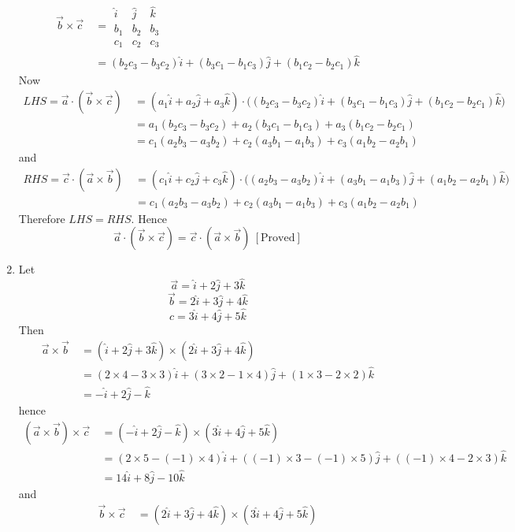 \documentclass{article}
\begin{document}
\begin{enumerate}
\begin{align*}
		\vec{b}\times\vec{c}\ &=\begin{array}{|ccc|}
			\hat{i}&\hat{j}&\hat{k}\\
			b_1&b_2&b_3\\
			c_1&c_2&c_3
		\end{array}\\
		&=(b_2c_3-b_3c_2)\hat{i}+(b_3c_1-b_1c_3)\hat{j}+(b_1c_2-b_2c_1)\hat{k}
		\end{align*}Now\begin{align*}
			LHS=\vec{a}\cdot (\vec{b}\times\vec{c})\ &=(a_1\hat{i}+a_2\hat{j}+a_3\hat{k})\cdot\Big((b_2c_3-b_3c_2)\hat{i}+(b_3c_1-b_1c_3)\hat{j}+(b_1c_2-b_2c_1)\hat{k}\Big)\\
			&=a_1(b_2c_3-b_3c_2)+a_2(b_3c_1-b_1c_3)+a_3(b_1c_2-b_2c_1)\\
			&=c_1(a_2b_3-a_3b_2)+c_2(a_3b_1-a_1b_3)+c_3(a_1b_2-a_2b_1)
		\end{align*}
		and\begin{align*}
			RHS=\vec{c}\cdot (\vec{a}\times\vec{b})\ &=(c_1\hat{i}+c_2\hat{j}+c_3\hat{k})\cdot\Big((a_2b_3-a_3b_2)\hat{i}+(a_3b_1-a_1b_3)\hat{j}+(a_1b_2-a_2b_1)\hat{k}\Big)\\
			&=c_1(a_2b_3-a_3b_2)+c_2(a_3b_1-a_1b_3)+c_3(a_1b_2-a_2b_1)
		\end{align*}
		Therefore $LHS=RHS$. Hence$$\vec{a}\cdot(\vec{b}\times\vec{c})=\vec{c}\cdot(\vec{a}\times\vec{b})\ [\text{Proved}]$$
		\item Let$$\vec{a}=\hat{i}+2\hat{j}+3\hat{k}$$$$\vec{b}=2\hat{i}+3\hat{j}+4\hat{k}$$$$c=3\hat{i}+4\hat{j}+5\hat{k}$$
		Then\begin{align*}
			\vec{a}\times\vec{b}\ &=(\hat{i}+2\hat{j}+3\hat{k})\times(2\hat{i}+3\hat{j}+4\hat{k})\\
			&=(2\times4-3\times3)\hat{i}+(3\times 2-1\times 4)\hat{j}+(1\times3-2\times2)\hat{k}\\
			&=-\hat{i}+2\hat{j}-\hat{k}
		\end{align*}hence
	\begin{align*}
		(\vec{a}\times\vec{b})\times\vec{c}\ &=(-\hat{i}+2\hat{j}-\hat{k})\times(3\hat{i}+4\hat{j}+5\hat{k})\\
		&=(2\times5-(-1)\times4)\hat{i}+((-1)\times3-(-1)\times5)\hat{j}+((-1)\times4-2\times3)\hat{k}\\
		&=14\hat{i}+8\hat{j}-10\hat{k}
	\end{align*}
		and\begin{align*}
			\vec{b}\times\vec{c}\ &=(2\hat{i}+3\hat{j}+4\hat{k})\times(3\hat{i}+4\hat{j}+5\hat{k})\\

\end{align*}
\end{enumerate}
\end{document}
